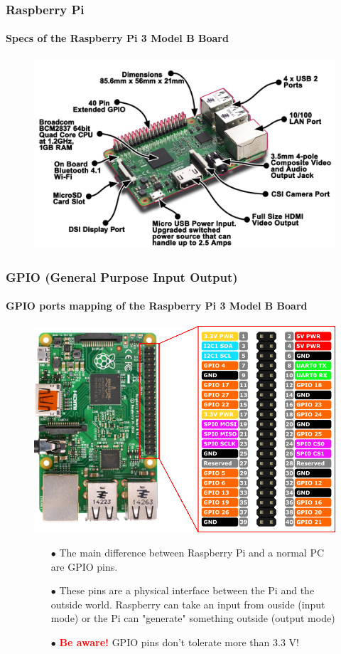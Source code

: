 \documentclass{beamer}
\begin{document}
\begin{frame}
\frametitle{\textbf{Raspberry Pi}}
\framesubtitle{\textbf{Specs of the Raspberry Pi 3 Model B Board}}
\begin{figure}
\centering
\includegraphics[scale=0.70]{imgs/rasp3btec.png}
\end{figure}
\end{frame}


\begin{frame}
\frametitle{\textbf{GPIO (General Purpose Input Output)}}
\framesubtitle{\textbf{GPIO ports mapping of the Raspberry Pi 3 Model B Board}}
\begin{figure}
\centering
\includegraphics[scale=0.8]{imgs/gpio.png}
\begin{itemize}
\item[$\bullet$]The main difference between Raspberry Pi and a normal PC are GPIO pins.
\item[$\bullet$]These pins are a physical interface between the Pi and the outside world. Raspberry can take an input from ouside (input mode) or the Pi can "generate" something outside (output mode)
\item[$\bullet$]\textcolor{red}{\textbf{Be aware!}} GPIO pins don't tolerate more than 3.3 V!
\end{itemize}
\end{figure}
\end{frame}
\end{document}
